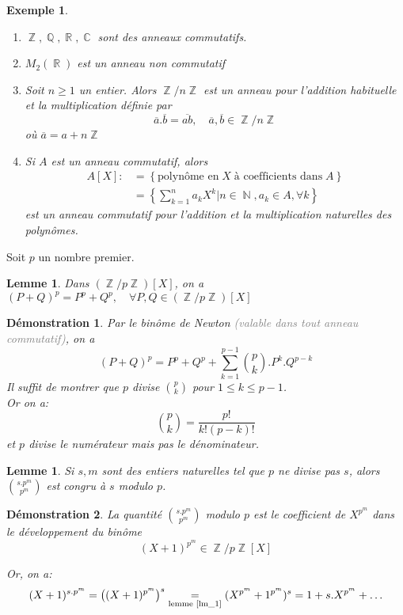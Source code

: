 \documentclass[a4paper, oneside]{report}
\theoremstyle{break}
\newtheorem{lemme}[thm]{Lemme}
\newtheorem{exemple}[thm]{Exemple}
\newtheorem*{demonstration}{Démonstration}
\newcommand{\gray}[1]{\textcolor{gray}{#1}}
\DeclareMathOperator{\R}{\mathbb{R}}
\DeclareMathOperator{\N}{\mathbb{N}}
\DeclareMathOperator{\C}{\mathbb{C}}
\DeclareMathOperator{\Z}{\mathbb{Z}}
\DeclareMathOperator{\Q}{\mathbb{Q}}
\DeclarePairedDelimiter\ens{\left\{ }{\right\} }%
\DeclarePairedDelimiter\pa{\big(}{\big)}%
\renewcommand{\ens}[1]{\left\{ #1 \right\} }%
\newcommand{\us}{\underset}
\newcommand{\ol}{\overline}
\newcommand{\ensem}{\ens}
\begin{document}
\begin{exemple}
\begin{enumerate}
\item  $\Z, \Q, \R, \C$ sont des anneaux commutatifs.

\medbreak

\item $M_2(\R)$ est un anneau non commutatif

\medbreak

\item Soit $n \geq 1$ un entier. Alors $\Z/n\Z$ est un anneau pour l'addition habituelle et la multiplication définie par 
\[
\ol{a} . \ol{b} = \ol{ab},		\quad	\ol{a}, \ol{b} \in \Z/n\Z
\]
où $\ol{a} = a + n \Z$

\medbreak

\item Si $A$ est un anneau commutatif, alors
\begin{align*}
A[X] :&= \ens{\text{polynôme en} \; X \; \text{à coefficients dans} \; A}
\\
&= \ensem{\sum_{k = 1}^n a_k X^k \big| n \in \N, a_k \in A, \forall k}
\end{align*}
est un anneau commutatif pour l'addition et la multiplication naturelles des polynômes.\\
\end{enumerate}
\end{exemple}

\noindent Soit $p$ un nombre premier.
\begin{lemme}
\label{lm_1}
Dans $(\Z/p\Z)[X]$, on a $(P + Q)^p = P^p + Q^p,	\quad	\forall P, Q \in (\Z/p\Z)[X]$
\end{lemme}

\begin{demonstration}
Par le binôme de Newton \gray{(valable dans tout anneau commutatif)}, on a 
\[
(P + Q)^p = P^p + Q^p + \sum_{k = 1}^{p-1} \binom{p}{k} . P^k . Q^{p-k}
\]
Il suffit de montrer que $p$ divise $\binom{p}{k}$ pour $1 \leq k \leq p - 1$.\\
Or on a:
\[
\binom{p}{k} = \frac{p!}{k! (p-k)!}
\]
et $p$ divise le numérateur mais pas le dénominateur.
\end{demonstration}

\begin{lemme}
Si $s, m$ sont des entiers naturelles tel que $p$ ne divise pas $s$, alors $\binom{s.p^m}{p^m}$ est congru à $s$ modulo $p$.
\end{lemme}

\begin{demonstration}
La quantité $\binom{s.p^m}{p^m}$ modulo $p$ est le coefficient de $X^{p^m}$ dans le développement du binôme 
\[
(X + 1)^{p^m} \in \Z/p\Z[X]
\]

Or, on a:
\[
(X + 1)^{s.p^m} = \pa{(X+1)^{p^m}}^s \us{\text{lemme \ref{lm_1}}}{=} (X^{p^m} + 1^{p^m})^s = 1 + s.X^{p^m} + \ldots 
\]
\end{demonstration}
\end{document}
